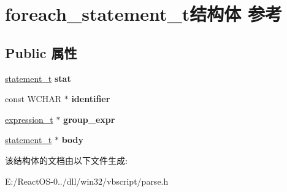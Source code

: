 \hypertarget{structforeach__statement__t}{}\section{foreach\+\_\+statement\+\_\+t结构体 参考}
\label{structforeach__statement__t}
\subsection*{Public 属性}
\begin{DoxyCompactItemize}
\item 
\mbox{\label{structforeach__statement__t_a424a322c0c9e6e72ec382a1551c53444}} 
\hyperlink{struct__statement__t}{statement\+\_\+t} {\bfseries stat}
\item 
\mbox{\label{structforeach__statement__t_ae9e1112ccb9dccb32b06549821094464}} 
const W\+C\+H\+AR $\ast$ {\bfseries identifier}
\item 
\mbox{\label{structforeach__statement__t_a1c3143963fa340001a7f447b028a39d8}} 
\hyperlink{struct__expression__t}{expression\+\_\+t} $\ast$ {\bfseries group\+\_\+expr}
\item 
\mbox{\label{structforeach__statement__t_a9103f9f115f6dfebb45d79308c0da999}} 
\hyperlink{struct__statement__t}{statement\+\_\+t} $\ast$ {\bfseries body}
\end{DoxyCompactItemize}


该结构体的文档由以下文件生成\+:\begin{DoxyCompactItemize}
\item 
E\+:/\+React\+O\+S-\/0../dll/win32/vbscript/parse.\+h\end{DoxyCompactItemize}
